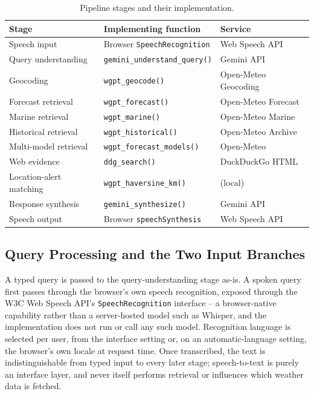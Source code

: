 \documentclass[sigconf,natbib=true,anonymous=true]{acmart}
\begin{document}
\begin{table}[htbp]
  \centering
  \caption{Pipeline stages and their implementation.}
  \label{tab:component-map}
  \scriptsize
  \begin{tabular}{p{1.7cm}p{3.1cm}p{1.9cm}}
    \toprule
    \textbf{Stage} & \textbf{Implementing function} & \textbf{Service} \\
    \midrule
    Speech input & Browser \texttt{SpeechRecognition} & Web Speech API \citep{w3c2024webspeech} \\
    Query understanding & \texttt{gemini\_\allowbreak understand\_\allowbreak query()} & Gemini API \\
    Geocoding & \texttt{wgpt\_geocode()} & Open-Meteo Geocoding \\
    Forecast retrieval & \texttt{wgpt\_forecast()} & Open-Meteo Forecast \\
    Marine retrieval & \texttt{wgpt\_marine()} & Open-Meteo Marine \\
    Historical retrieval & \texttt{wgpt\_\allowbreak historical()} & Open-Meteo Archive \\
    Multi-model retrieval & \texttt{wgpt\_\allowbreak forecast\_\allowbreak models()} & Open-Meteo \\
    Web evidence & \texttt{ddg\_search()} & DuckDuckGo HTML \\
    Location-alert matching & \texttt{wgpt\_\allowbreak haversine\_\allowbreak km()} & (local) \\
    Response synthesis & \texttt{gemini\_\allowbreak synthesize()} & Gemini API \\
    Speech output & Browser \texttt{speechSynthesis} & Web Speech API \citep{w3c2024webspeech} \\
    \bottomrule
  \end{tabular}
\end{table}

\subsection{Query Processing and the Two Input Branches}

A typed query is passed to the query-understanding stage as-is. A spoken query first passes through the browser's own speech recognition, exposed through the W3C Web Speech API's \texttt{SpeechRecognition} interface \citep{w3c2024webspeech} -- a browser-native capability rather than a server-hosted model such as Whisper, and the implementation does not run or call any such model. Recognition language is selected per user, from the interface setting or, on an automatic-language setting, the browser's own locale at request time. Once transcribed, the text is indistinguishable from typed input to every later stage; speech-to-text is purely an interface layer, and never itself performs retrieval or influences which weather data is fetched.
\end{document}
